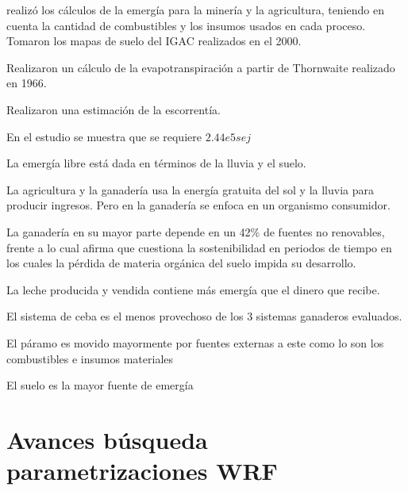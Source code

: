 \citep{Castro-Romero2014} realizó los cálculos de la emergía para la minería y la agricultura, teniendo en cuenta la cantidad de combustibles y los insumos usados en cada proceso. Tomaron los mapas de suelo del IGAC realizados en el 2000.

Realizaron un cálculo de la evapotranspiración a partir de Thornwaite realizado en 1966.

Realizaron una estimación de la escorrentía. 

En el estudio se muestra que se requiere $2.44e5 sej$

La emergía libre está dada en términos de la lluvia y el suelo.

La agricultura y la ganadería usa la energía gratuita del sol y la lluvia para producir ingresos. Pero en la ganadería se enfoca en un organismo consumidor.

La ganadería en su mayor parte depende en un 42\% de fuentes no renovables, frente a lo cual \citet{Castro-Romero2014} afirma que cuestiona la sostenibilidad en periodos de tiempo en los cuales la pérdida de materia orgánica del suelo impida su desarrollo.

La leche producida y vendida contiene más emergía que el dinero que recibe.

El sistema de ceba es el menos provechoso de los 3 sistemas ganaderos evaluados.

El páramo es movido mayormente por fuentes externas a este como lo son los combustibles e insumos materiales

El suelo es la mayor fuente de emergía












\section{Avances búsqueda parametrizaciones WRF}


